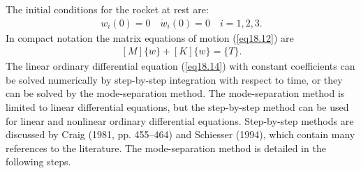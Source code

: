 \documentclass{AeroStructure-ERJohnson}
\begin{document}
The initial conditions for the rocket at rest are:
\begin{align}\label{eq18.13}
w_{i}(0)=0 \quad \dot{w}_{i}(0)=0 \quad i=1,2,3.
\end{align}
In compact notation the matrix equations of motion (\ref{eq18.12}) are
\begin{align}\label{eq18.14}
[M]\{\ddot{w}\}+[K]\{{w}\}=\{T\}.
\end{align}
The linear ordinary differential equation (\ref{eq18.14}) with constant coefficients can be solved numerically by step-by-step integration with respect to time, or they can be solved by the mode-separation method. The mode-separation method is limited to linear differential equations, but the step-by-step method can be used for linear and nonlinear ordinary differential equations. Step-by-step methods are discussed by Craig (1981, pp. 455--464) and Schiesser (1994), which contain many references to the literature. The mode-separation method is detailed in the following steps.
\end{document}
